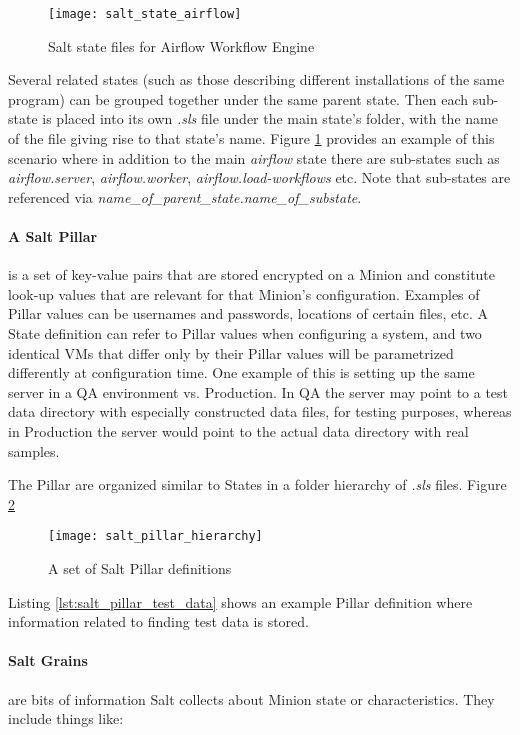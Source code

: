 \begin{figure}[H]
\texttt{[image: salt\_state\_airflow]}
\centering
\caption {Salt state files for Airflow Workflow Engine}
\label{fig:salt_state_airflow}
\end{figure}

Several related states (such as those describing different installations of the same program) can be grouped together under the same parent state. Then each sub-state is placed into its own \emph{.sls} file under the main state's folder, with the name of the file giving rise to that state's name. Figure \ref{fig:salt_state_airflow} provides an example of this scenario where in addition to the main \emph{airflow} state there are sub-states such as \emph{airflow.server}, \emph{airflow.worker}, \emph{airflow.load-workflows} etc. Note that sub-states are referenced via \emph{name\_of\_parent\_state.name\_of\_substate}.

\paragraph{A Salt Pillar} is a set of key-value pairs that are stored encrypted on a Minion and constitute look-up values that are relevant for that Minion's configuration. Examples of Pillar values can be usernames and passwords, locations of certain files, etc. A State definition can refer to Pillar values when configuring a system, and two identical VMs that differ only by their Pillar values will be parametrized differently at configuration time. One example of this is setting up the same server in a QA environment vs. Production. In QA the server may point to a test data directory with especially constructed data files, for testing purposes, whereas in Production the server would point to the actual data directory with real samples.

The Pillar are organized similar to States in a folder hierarchy of \emph{.sls} files. Figure \ref{fig:salt_pillar_hierarchy}

\begin{figure}[H]
\texttt{[image: salt\_pillar\_hierarchy]}
\centering
\caption {A set of Salt Pillar definitions}
\label{fig:salt_pillar_hierarchy}
\end{figure}

Listing \ref{lst:salt_pillar_test_data} shows an example Pillar definition where information related to finding test data is stored.

\paragraph{Salt Grains} are bits of information Salt collects about Minion state or characteristics. They include things like:

